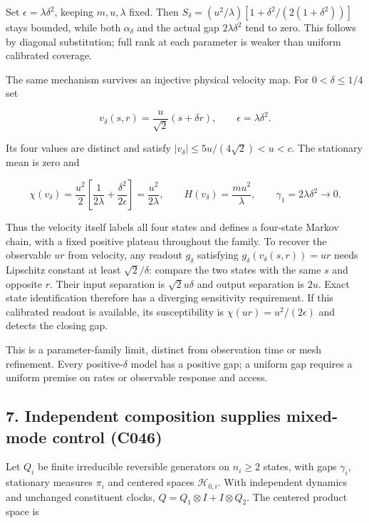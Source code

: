 \documentclass[11pt,a4paper]{article}
\begin{document}
Set \(\epsilon=\lambda\delta^2\), keeping \(m,u,\lambda\) fixed. Then
\(S_\delta=(u^2/\lambda)[1+\delta^2/(2(1+\delta^2))]\) stays bounded,
while both \(\alpha_\delta\) and the actual gap \(2\lambda\delta^2\)
tend to zero. This follows by diagonal substitution; full rank at each
parameter is weaker than uniform calibrated coverage.

The same mechanism survives an injective physical velocity map. For
\(0<\delta\le1/4\) set

\[
v_\delta(s,r)=\frac{u}{\sqrt2}(s+\delta r),\qquad
\epsilon=\lambda\delta^2.
\]

Its four values are distinct and satisfy
\(|v_\delta|\le5u/(4\sqrt2)<u<c\). The stationary mean is zero and

\[
\chi(v_\delta)=\frac{u^2}{2}\left[\frac1{2\lambda}
+\frac{\delta^2}{2\epsilon}\right]=\frac{u^2}{2\lambda},\qquad
H(v_\delta)=\frac{mu^2}{\lambda},\qquad
\gamma_1=2\lambda\delta^2\longrightarrow0.
\]

Thus the velocity itself labels all four states and defines a four-state
Markov chain, with a fixed positive plateau throughout the family. To
recover the observable \(ur\) from velocity, any readout \(g_\delta\)
satisfying \(g_\delta(v_\delta(s,r))=ur\) needs Lipschitz constant at
least \(\sqrt2/\delta\): compare the two states with the same \(s\) and
opposite \(r\). Their input separation is \(\sqrt2u\delta\) and output
separation is \(2u\). Exact state identification therefore has a
diverging sensitivity requirement. If this calibrated readout is
available, its susceptibility is \(\chi(ur)=u^2/(2\epsilon)\) and
detects the closing gap.

This is a parameter-family limit, distinct from observation time or mesh
refinement. Every positive-\(\delta\) model has a positive gap; a
uniform gap requires a uniform premise on rates or observable response
and access.

\hypertarget{independent-composition-supplies-mixed-mode-control-c046}{%
\subsection{7. Independent composition supplies mixed-mode control
(C046)}\label{independent-composition-supplies-mixed-mode-control-c046}}

Let \(Q_i\) be finite irreducible reversible generators on \(n_i\ge2\)
states, with gaps \(\gamma_i\), stationary measures \(\pi_i\) and
centered spaces \(\mathcal H_{0,i}\). With independent dynamics and
unchanged constituent clocks, \(Q=Q_1\otimes I+I\otimes Q_2\). The
centered product space is
\end{document}
